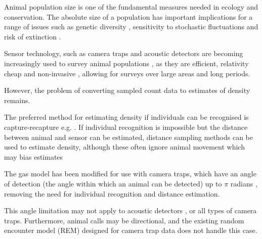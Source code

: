 Animal population size is one of the fundamental measures needed in ecology and conservation. The absolute size of a population has important implications for a range of issues such as genetic diversity \citep{o1985genetic, fischer2000genetic, willi2005threefold}, sensitivity to stochastic fluctuations \citep{richter1972extinction,wright1983stochastic} and risk of extinction \citep{purvis2000predicting}.

Sensor technology, such as camera traps \citep{rowcliffe2008surveys,ahumada2011community} and acoustic detectors \citep{ofarrel1999comparison,mellinger2007fixed,jones2011indicator} are becoming increasingly used to survey animal populations \citep{rowcliffe2008surveys, kessel2014review}, as they are efficient, relativity cheap and non-invasive \citep{gese2001monitoring, o2003crouching, silveira2003camera}, allowing for surveys over large areas and long periods. 


However, the problem of converting sampled count data to estimates of density remains. 


The preferred method for estimating density if individuals can be recognised is capture-recapture e.g. \citep{karanth1995, trolle2003estimation, soisalo2006estimating, trolle2007camera}. If individual recognition is impossible but the distance between animal and sensor can be estimated, distance sampling methods can be used to estimate density, although these often ignore animal movement which may bias estimates \citep{barlow2005estimates, marques2011estimating}

The gas model has been modified for use with camera traps, which have an angle of detection (the angle within which an animal can be detected)  up to $\pi$ radians \citep{rowcliffe2008estimating}, removing the need for individual recognition and distance estimation. 

This angle limitation may not apply to acoustic detectors \citep{adams2012you}, or all types of camera traps. Furthermore, animal calls may be directional, and the existing random encounter model (REM) designed for camera trap data does not handle this case.

